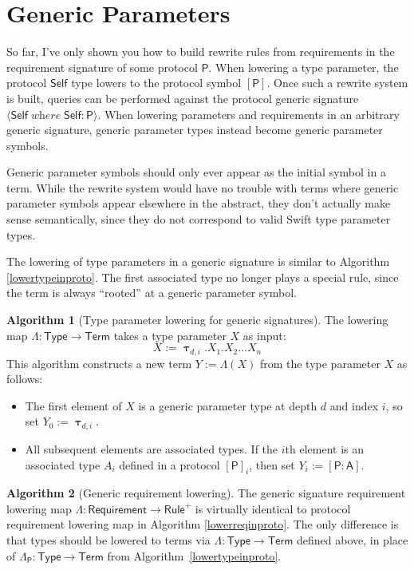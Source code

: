 \documentclass[a4paper,headsepline,bibliography=totoc,toc=flat,fleqn,twoside=semi]{scrbook}
\theoremstyle{definition}
\theoremstyle{definition}
\theoremstyle{definition}
\newtheorem{algorithm}{Algorithm}[chapter]
\newcommand{\namesym}[1]{\mathsf{#1}}
\newcommand{\genericparam}[1]{\bm{\mathsf{#1}}}
\newcommand{\proto}[1]{\bm{\mathsf{#1}}}
\newcommand{\protosym}[1]{[\proto{#1}]}
\newcommand{\gensig}[2]{\langle #1\;\textit{where}\;#2\rangle}
\newcommand{\genericsym}[2]{\bm{\uptau}_{#1,#2}}
\newcommand{\assocsym}[2]{[\proto{#1}\colon\namesym{#2}]}
\begin{document}
\section{Generic Parameters}\label{genericparamsym}
So far, I've only shown you how to build rewrite rules from requirements in the requirement signature of some protocol $\proto{P}$. When lowering a type parameter, the protocol $\genericparam{Self}$ type lowers to the protocol symbol $\protosym{P}$. Once such a rewrite system is built, queries can be performed against the protocol generic signature $\gensig{\genericparam{Self}}{\genericparam{Self}\colon\proto{P}}$. When lowering parameters and requirements in an arbitrary generic signature, generic parameter types instead become generic parameter symbols.

Generic parameter symbols should only ever appear as the initial symbol in a term. While the rewrite system would have no trouble with terms where generic parameter symbols appear elsewhere in the abstract, they don't actually make sense semantically, since they do not correspond to valid Swift type parameter types.

The lowering of type parameters in a generic signature is similar to Algorithm \ref{lowertypeinproto}. The first associated type no longer plays a special rule, since the term is always ``rooted'' at a generic parameter symbol.

\begin{algorithm}[Type parameter lowering for generic signatures]\label{lowertypeinsig}
The lowering map $\Lambda\colon\namesym{Type}\rightarrow\namesym{Term}$ takes a type parameter $X$ as input:
\[X:=\genericsym{d}{i}.X_1.X_2\ldots X_n\]
This algorithm constructs a new term $Y:=\Lambda(X)$ from the type parameter $X$ as follows:
\begin{itemize}
\item
The first element of $X$ is a generic parameter type at depth $d$ and index $i$, so set $Y_0:=\genericsym{d}{i}$.
\item
All subsequent elements are associated types. If the $i$th element is an associated type $A_i$ defined in a protocol $\protosym{P}_i$, then set $Y_i:=\assocsym{P}{A}$.
\end{itemize}
\end{algorithm}

\begin{algorithm}[Generic requirement lowering]
The generic signature requirement lowering map $\Lambda\colon \namesym{Requirement}\rightarrow\namesym{Rule}^+$ is virtually identical to protocol requirement lowering map in Algorithm \ref{lowerreqinproto}. The only difference is that types should be lowered to terms via $\Lambda\colon\namesym{Type}\rightarrow\namesym{Term}$ defined above, in place of $\Lambda_{\proto{P}}\colon\namesym{Type}\rightarrow\namesym{Term}$ from Algorithm~\ref{lowertypeinproto}.
\end{algorithm}
\end{document}
